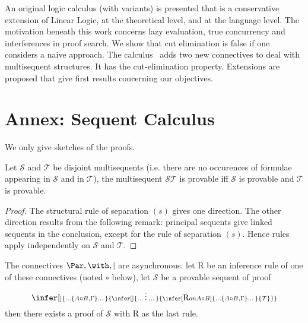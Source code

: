\documentclass{llncs}
\def\scriptInfer[#1]#2#3{\infer[\scriptstyle #1]{\scriptstyle #2}{\scriptstyle #3}}\def\scriptInferD#1#2{\infer{\scriptstyle #1}{\scriptstyle #2}}
\newcommand{\cpar}{\mid}
\begin{document}
An original logic calculus (with variants) is presented that is a conservative extension of Linear Logic, at the theoretical level, and at the language level. 
The motivation beneath this work concerns lazy evaluation,
true concurrency and interferences in proof search.
We show that cut elimination is false if one considers a naive approach. The calculus \CMALL\ adds two new connectives to deal with multisequent structures. It has the cut-elimination property. Extensions are proposed that give first results concerning our objectives.
 






\newpage
\section{Annex: Sequent Calculus}





We only give sketches of the proofs.

\begin{lemma}[Separability]
Let $\mathcal S$ and $\mathcal T$ be disjoint multisequents (i.e. there are no occurences of formulae appearing in $\mathcal S$ and 
in $\mathcal T$), the multisequent $\mathcal S \mathcal T$ is provable iff $\mathcal S$ is provable and $\mathcal T$ is provable. 
\end{lemma}

\begin{proof}
The structural rule of separation $(s)$ gives one direction. The other direction results from the following remark: principal sequents give linked sequents in the conclusion, except for the rule of separation $(s)$. Hence rules apply independently on $\mathcal S$ and $\mathcal T$.
\end{proof}





\begin{lemma}[Asynchrony]
The connectives $\Par, \with, \cpar$ are asynchronous: let R be an 
inference rule of one of these connectives (noted $\circ$ below), let 
$\mathcal S$ be a provable sequent of proof
$$
\scriptInfer[]{\dots \{A\circ B, \Gamma\} \dots}
    {\scriptInfer[]{\dots \: \vdots \: \dots}
         {\scriptInfer[\mbox{R on }A\circ B]{\dots \{A\circ B, \Gamma\} \dots}
              {\mathcal T}
          }
     }
$$
then there exists a proof of $\mathcal S$ with R as the last rule.
\end{lemma}
\end{document}
